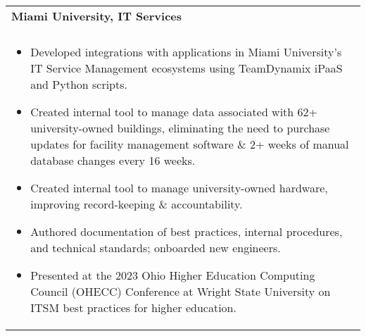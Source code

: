 \documentclass[letterpaper,10pt]{article} %
\begin{document}
\begin{tabular*}{\linewidth}{@{\extracolsep{\fill}} lr }
\textbf{Miami University, IT Services} & \scriptsize\bfseries\color{sectioncolour}{Oxford, OH}\\
\footnotesize\bfseries\color{sectioncolour}{Software Engineer Intern} & \scriptsize\bfseries\color{sectioncolour}{May 2022 - May 2024}\\
\multicolumn{2}{p{\linewidth}}{
    \scriptsize{\vspace{-0.1in}\begin{itemize}
        \item Developed integrations with applications in Miami University's IT Service Management ecosystems using TeamDynamix iPaaS and Python scripts.
        \item Created internal tool to manage data associated with 62+ university-owned buildings, eliminating the need to purchase updates for facility management software \& 2+ weeks of manual database changes every 16 weeks.
        \item Created internal tool to manage university-owned hardware, improving record-keeping \& accountability.
        \item Authored documentation of best practices, internal procedures, and technical standards; onboarded new engineers.
        \item Presented at the 2023 Ohio Higher Education Computing Council (OHECC) Conference at Wright State University on ITSM best practices for higher education.
    \end{itemize}\vspace{-0.0in}}
}\\


\end{tabular*}
\end{document}
